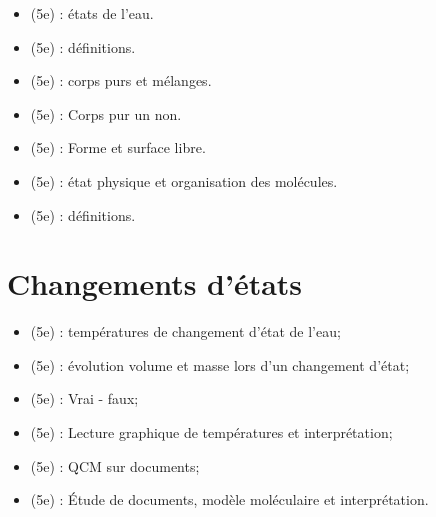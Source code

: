 \documentclass[12pt,a4paper]{article}
\begin{document}
\begin{myexos}
	\begin{itemize}
		\item {} (5e) : états de l'eau.
		\item {} (5e) : définitions.
		\item {} (5e) : corps purs et mélanges.
		\item {} (5e) : Corps pur un non.
		\item {} (5e) : Forme et surface libre.
		\item {} (5e) : état physique et organisation des molécules.
		\item {} (5e) : définitions.
	\end{itemize}
\end{myexos}

\section{Changements d'états}



\begin{myexos}
	\begin{itemize}
		
		\item {} (5e) : températures de changement d'état de l'eau;
		\item {} (5e) : évolution volume et masse lors d'un changement d'état;
		\item {} (5e) : Vrai - faux;
		\item {} (5e) : Lecture graphique de températures et interprétation;
		\item {} (5e) : QCM sur documents;
		\item {} (5e) : \'Etude de documents, modèle moléculaire et interprétation.
	\end{itemize}
\end{myexos}



\end{document}
